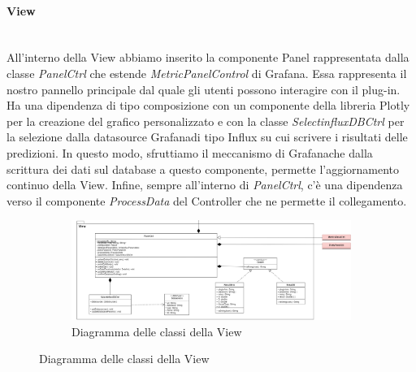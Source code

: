 \paragraph{View} \mbox{}\\ [1mm]
All'interno della View abbiamo inserito la componente Panel rappresentata dalla classe \textit{PanelCtrl} che estende \textit{MetricPanelControl} di Grafana\glo. Essa rappresenta il nostro pannello principale dal quale gli utenti possono interagire con il plug-in.
Ha una dipendenza di tipo composizione con un componente della libreria Plotly per la creazione del grafico personalizzato e con la classe \textit{SelectinfluxDBCtrl} per la selezione dalla datasource Grafana\glosp di tipo Influx su cui scrivere i risultati delle predizioni. In questo modo, sfruttiamo il meccanismo di Grafana\glosp che dalla scrittura dei dati sul database a questo componente, permette l'aggiornamento continuo della View.
Infine, sempre all'interno di \textit{PanelCtrl}, c'è una dipendenza verso il componente \textit{ProcessData} del Controller che ne permette il collegamento.
\mbox{}
\begin{landscape}
	\begin{figure}
		\begin{figure} [H]
			\includegraphics[width=\linewidth]{./img/Diagrammi/view-plug-in.png}
			\caption{Diagramma delle classi della View}
		\end{figure}
	\end{figure}
\end{landscape}
